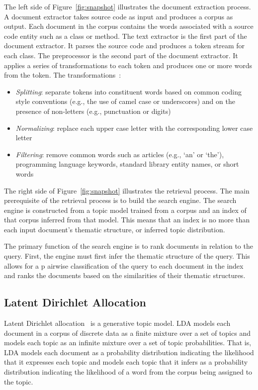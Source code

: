 The left side of Figure~\ref{fig:snapshot} illustrates the document extraction
process.  A document extractor takes source code as input and produces a corpus
as output.  Each document in the corpus contains the words associated with
a source code entity such as a class or method.  The text extractor is the first
part of the document extractor.  It parses the source code and produces a token
stream for each class.  The preprocessor is the second part of the document
extractor.  It applies a series of transformations to each token and produces
one or more words from the token.
The transformations~\cite{Marcus-etal:2004,Marcus-Menzies:2010}: %
\begin{itemize}
    \item {\it Splitting}: separate tokens into constituent words based on
        common coding style conventions (e.g., the use of camel case or
        underscores) and on the presence of non-letters (e.g., punctuation or
        digits)
    \item {\it Normalizing}: replace each upper case letter with the
        corresponding lower case letter
    \item {\it Filtering}: remove common words such as articles (e.g., `an' or
        `the'), programming language keywords, standard library entity names, or
        short words
\end{itemize}

The right side of Figure~\ref{fig:snapshot} illustrates the retrieval process.
The main prerequisite of the retrieval process is to build the search engine.
The search engine is constructed from a topic model trained from a corpus and an
index of that corpus inferred from that model.
This means that an index is no more than each input document's thematic
structure, or inferred topic distribution.

The primary function of the search engine is to rank documents in relation to
the query.  First, the engine must first infer the thematic structure of the
query.  This allows for a p airwise classification of the query to each document
in the index and ranks the documents based on the similarities of their thematic
structures.

\subsection{Latent Dirichlet Allocation}

Latent Dirichlet allocation~\cite{Blei-etal:2003} is a generative topic model.
LDA models each document in a corpus of discrete data as a finite mixture over
a set of topics and models each topic as an infinite mixture over a set of
topic probabilities.  That is, LDA models each document as a probability
distribution indicating the likelihood that it expresses each topic and models
each topic that it infers as a probability distribution indicating the
likelihood of a word from the corpus being assigned to the topic.

